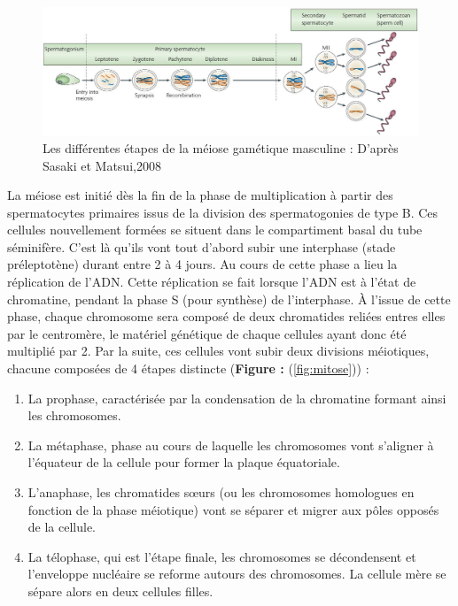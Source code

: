 \documentclass[12pt,twoside]{reedthesis}
\providecommand{\tightlist}{%
  \setlength{\itemsep}{0pt}\setlength{\parskip}{0pt}}
\theoremstyle{definition}
\theoremstyle{definition}
\theoremstyle{remark}
\begin{document}
  \begin{figure}
  
  {\centering \includegraphics[scale=0.35]{figure/Meiosis_Stages} 
  
  }
  
  \caption[Les différentes étapes de la méiose gamétique masculine]{Les différentes étapes de la méiose gamétique masculine : D’après Sasaki et Matsui,2008}\label{fig:meiose}
  \end{figure}
  
  La méiose est initié dès la fin de la phase de multiplication à partir
  des spermatocytes primaires issus de la division des spermatogonies de
  type B. Ces cellules nouvellement formées se situent dans le
  compartiment basal du tube séminifère. C'est là qu'ils vont tout d'abord
  subir une interphase (stade préleptotène) durant entre 2 à 4 jours. Au
  cours de cette phase a lieu la réplication de l'ADN. Cette réplication
  se fait lorsque l'ADN est à l'état de chromatine, pendant la phase S
  (pour synthèse) de l'interphase. À l'issue de cette phase, chaque
  chromosome sera composé de deux chromatides reliées entres elles par le
  centromère, le matériel génétique de chaque cellules ayant donc été
  multiplié par 2. Par la suite, ces cellules vont subir deux divisions
  méiotiques, chacune composées de 4 étapes distincte (\textbf{Figure :
  }(\ref{fig:mitose})) :
  
  \begin{enumerate}
  \def\labelenumi{\arabic{enumi}.}
  \tightlist
  \item
    La prophase, caractérisée par la condensation de la chromatine formant
    ainsi les chromosomes.\\
  \item
    La métaphase, phase au cours de laquelle les chromosomes vont
    s'aligner à l'équateur de la cellule pour former la plaque
    équatoriale.
  \item
    L'anaphase, les chromatides sœurs (ou les chromosomes homologues en
    fonction de la phase méiotique) vont se séparer et migrer aux pôles
    opposés de la cellule.\\
  \item
    La télophase, qui est l'étape finale, les chromosomes se décondensent
    et l'enveloppe nucléaire se reforme autours des chromosomes. La
    cellule mère se sépare alors en deux cellules filles.
  \end{enumerate}
  
\end{document}
